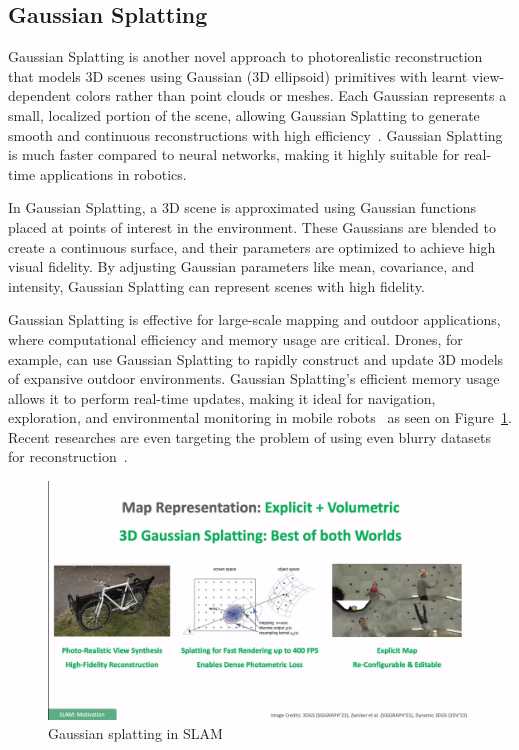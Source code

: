 \subsection{Gaussian Splatting}

Gaussian Splatting is another novel approach to photorealistic reconstruction that models 3D scenes using Gaussian (3D ellipsoid) primitives with learnt view-dependent colors rather than point clouds or meshes. Each Gaussian represents a small, localized portion of the scene, allowing Gaussian Splatting to generate smooth and continuous reconstructions with high efficiency~\cite{3DGS}. Gaussian Splatting is much faster compared to neural networks, making it highly suitable for real-time applications in robotics.

In Gaussian Splatting, a 3D scene is approximated using Gaussian functions placed at points of interest in the environment. These Gaussians are blended to create a continuous surface, and their parameters are optimized to achieve high visual fidelity. By adjusting Gaussian parameters like mean, covariance, and intensity, Gaussian Splatting can represent scenes with high fidelity.

Gaussian Splatting is effective for large-scale mapping and outdoor applications, where computational efficiency and memory usage are critical. Drones, for example, can use Gaussian Splatting to rapidly construct and update 3D models of expansive outdoor environments. Gaussian Splatting’s efficient memory usage allows it to perform real-time updates, making it ideal for navigation, exploration, and environmental monitoring in mobile robots~\cite{active_splat} as seen on Figure~\ref{fig:gsplat_slam}. Recent researches are even targeting the problem of using even blurry datasets for reconstruction~\cite{gsplat_blur}.

\FloatBarrier
\begin{figure}[htbp]
	\centering
	\includegraphics[width=150mm, keepaspectratio]{figures_jpg/gsplat_slam.jpg}
	\caption{Gaussian splatting in SLAM}
	\label{fig:gsplat_slam}
\end{figure}
\FloatBarrier


